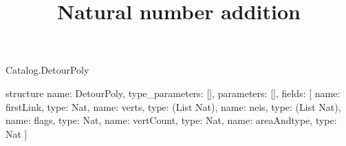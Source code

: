 \begin{lexlean}{Catalog.DetourPoly}
\title{Natural number addition}
\begin{semanticmodule}
structure{
  name: DetourPoly,
  type_parameters: [],
  parameters: [],
  fields: [
    {name: firstLink, type: Nat},
    {name: verts, type: (List Nat)},
    {name: neis, type: (List Nat)},
    {name: flags, type: Nat},
    {name: vertCount, type: Nat},
    {name: areaAndtype, type: Nat}
  ]
}
\end{semanticmodule}
\end{lexlean}
